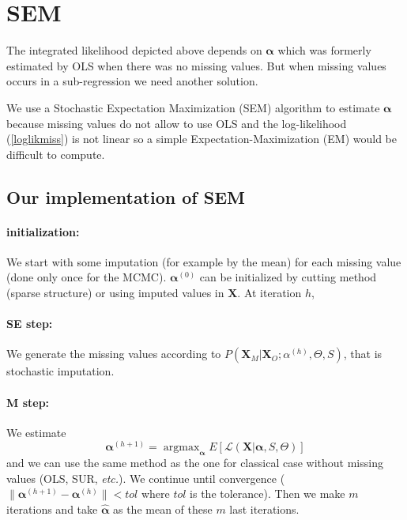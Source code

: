 \documentclass[12pt,a4paper]{report}
\begin{document}
%	
			
%	
\section{SEM}
	The integrated likelihood depicted above depends on $\boldsymbol{\alpha}$ which was formerly estimated by OLS when there was no missing values. But when missing values occurs in a sub-regression we need another solution.
	
	We use a  Stochastic Expectation Maximization (SEM) algorithm \cite{celeux1986algorithme} to estimate $\boldsymbol{\alpha}$ because missing values do not allow to use OLS and  the log-likelihood (\ref{loglikmiss}) is not linear so a simple Expectation-Maximization (EM) would be difficult to compute.
		
	\subsection{Our implementation of SEM}
	\paragraph{initialization:} We start with some imputation (for example by the mean) for each missing value (done only once for the MCMC). $\boldsymbol{\alpha}^{(0)}$ can be initialized by cutting method	(sparse structure) or using imputed values in $\boldsymbol{X}$.
	At iteration $h$,
	\paragraph{SE step:}
		We generate the missing values according to $P(\boldsymbol{X}_M|\boldsymbol{X}_O; \alpha^{(h)},\Theta,S)$, that is stochastic imputation.
	\paragraph{M step:}
		We estimate 
		\begin{equation}
	\boldsymbol{\alpha}^{(h+1)}=\operatorname{argmax}_{\boldsymbol{\alpha}}E\left[\mathcal{L}(\boldsymbol{X}|\boldsymbol{\alpha},S,\Theta) \right]
\end{equation}
and we can use the same method as the one for classical case without missing values (OLS, SUR, {\it etc.}).
		We continue until convergence ($\parallel \boldsymbol{\alpha}^{(h+1)} - \boldsymbol{\alpha}^{(h)}\parallel < tol $ where $tol$ is the tolerance). Then we make $m$ iterations and take $\hat{\boldsymbol{\alpha}}$ as the mean of these $m$ last iterations.
		
\end{document}

